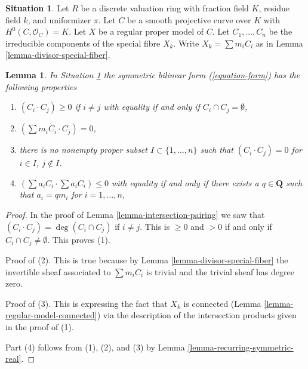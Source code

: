 \documentclass[10pt,a4paper]{amsart}
\theoremstyle{plain}
\newtheorem{lemma}[subsection]{Lemma}
\theoremstyle{definition}
\newtheorem{situation}[subsection]{Situation}
\theoremstyle{remark}
\numberwithin{equation}{subsection}
\begin{document}
\begin{situation}
\label{situation-regular-model}
Let $R$ be a discrete valuation ring with fraction field $K$,
residue field $k$, and uniformizer $\pi$.
Let $C$ be a smooth projective curve over $K$ with $H^0(C, \mathcal{O}_C) = K$.
Let $X$ be a regular proper model of $C$.
Let $C_1, \ldots, C_n$ be the irreducible components of the special
fibre $X_k$. Write $X_k = \sum m_i C_i$ as in
Lemma \ref{lemma-divisor-special-fiber}.
\end{situation}

\begin{lemma}
\label{lemma-properties-form}
In Situation \ref{situation-regular-model} the symmetric bilinear form
(\ref{equation-form}) has the following properties
\begin{enumerate}
\item $(C_i \cdot C_j) \geq 0$ if $i \not = j$ with equality if and only
if $C_i \cap C_j = \emptyset$,
\item $(\sum m_i C_i \cdot C_j) = 0$,
\item there is no nonempty proper subset $I \subset \{1, \ldots, n\}$
such that $(C_i \cdot C_j) = 0$ for $i \in I$, $j \not \in I$.
\item $(\sum a_i C_i \cdot \sum a_i C_i) \leq 0$ with equality if and
only if there exists a $q \in \mathbf{Q}$ such that $a_i = qm_i$
for $i = 1, \ldots, n$,
\end{enumerate}
\end{lemma}

\begin{proof}
In the proof of Lemma \ref{lemma-intersection-pairing} we saw that
$(C_i \cdot C_j) = \deg(C_i \cap C_j)$ if $i \not = j$. This is
$\geq 0$ and $> 0 $ if and only if $C_i \cap C_j \not = \emptyset$.
This proves (1).

\medskip\noindent
Proof of (2). This is true because by Lemma \ref{lemma-divisor-special-fiber}
the invertible sheaf associated to $\sum m_i C_i$
is trivial and the trivial sheaf has degree zero.

\medskip\noindent
Proof of (3). This is expressing the fact that $X_k$ is connected
(Lemma \ref{lemma-regular-model-connected})
via the description of the intersection products given in the proof of (1).

\medskip\noindent
Part (4) follows from (1), (2), and (3) by
Lemma \ref{lemma-recurring-symmetric-real}.
\end{proof}
\end{document}
